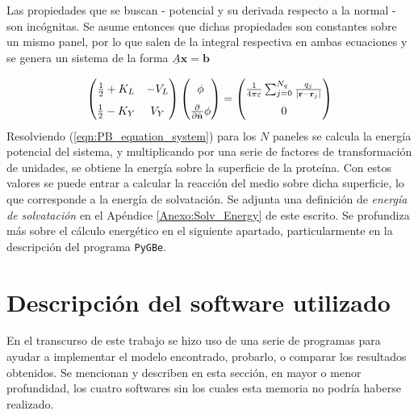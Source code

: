 \documentclass[12pt, twoside, onehalfspace, numbers, spanish]{ezthesis}
\numberwithin{equation}{section}
\begin{document}
\noindent
Las propiedades que se buscan - potencial y su derivada respecto a la normal - son incógnitas. Se asume entonces que dichas propiedades son constantes sobre un mismo panel, por lo que salen de la integral respectiva en ambas ecuaciones y se genera un sistema de la forma $\underline{A}\mathbf{x} = \mathbf{b}$

\begin{equation}\label{eqn:PB_equation_system}
	\renewcommand\arraystretch{1.6}
	\begin{pmatrix}
		\frac{1}{2} + K_L & -V_L \\ \frac{1}{2} - K_Y & V_Y
	\end{pmatrix}
	\begin{pmatrix}
		\phi \\ \frac{\partial}{\partial\hat{\mathbf{n}}}\phi
	\end{pmatrix}
	=
	\begin{pmatrix}
		\frac{1}{4\pi\varepsilon}\sum_{j=0}^{N_q}\frac{q_j}{|\mathbf{r} - \mathbf{r}_j|} \\ 0
	\end{pmatrix}
\end{equation}
\noindent
Resolviendo (\ref{eqn:PB_equation_system}) para los $N$ paneles se calcula la energía potencial del sistema, y multiplicando por una serie de factores de transformación de unidades, se obtiene la energía sobre la superficie de la proteína. Con estos valores se puede entrar a calcular la reacción del medio sobre dicha superficie, lo que corresponde a la energía de solvatación. Se adjunta una definición de \textit{energía de solvatación} en el Apéndice \ref{Anexo:Solv_Energy} de este escrito. Se profundiza más sobre el cálculo energético en el siguiente apartado, particularmente en la descripción del programa \texttt{PyGBe}.






\section{Descripción del software utilizado}\label{Sec:SW_Description}
En el transcurso de este trabajo se hizo uso de una serie de programas para ayudar a implementar el modelo encontrado, probarlo, o comparar los resultados obtenidos. Se mencionan y describen en esta sección, en mayor o menor profundidad, los cuatro softwares sin los cuales esta memoria no podría haberse realizado.
\end{document}
